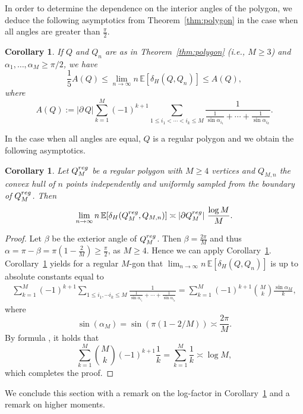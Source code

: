 \documentclass[a4paper,12pt]{article}
\newtheorem{corollary}[proposition]{Corollary}
\theoremstyle{definition}
\newcommand{\IE}{\mathbb{E}}
\begin{document}
In order to determine the dependence on the interior angles of the polygon, we deduce the following asymptotics from Theorem~\ref{thm:polygon} in the case when all angles are greater than $\frac{\pi}{2}$.

\begin{corollary}\label{cor:asymptotics}
If $Q$ and $Q_n$ are as in Theorem~\ref{thm:polygon} (i.e., $M\geq 3$) and $\alpha_1,\dots,\alpha_M\ge \pi/2$, we have
\begin{equation*}\label{polygon-5}
\frac{1}{5} A(Q) 
\le \lim_{n\to\infty}n \, \IE[\delta_H(Q,Q_n)]
\le A(Q),
\end{equation*}
where 
\[
A(Q)
:= \left| \partial \, Q \right|\sum_{k=1}^{M}(-1)^{k+1}\sum_{1\leq i_{1}<\cdots< i_{k}\leq M} \frac{1}{\frac{1}{\sin\alpha_{i_{1}}}+\cdots+\frac{1}{\sin\alpha_{i_{k}}}}.
\]
\end{corollary}

In the case when all angles are equal, $Q$ is a regular polygon and we obtain the following asymptotics.

\begin{corollary}\label{cor:mgon}
Let $Q_M^{\rm reg}$ be a regular polygon with $M\ge 4$ vertices and $Q_{M,n}$ the convex hull of $n$ points independently and uniformly sampled from the boundary of $Q_M^{\rm reg}$. Then
\[
\lim_{n\to\infty}n \, \IE[\delta_H(Q_M^{\rm reg},Q_{M,n})]\asymp \left |\partial Q_M^{\rm reg}\right| \, \frac{\log M}{M}. 
\]
\end{corollary}
\begin{proof}
Let $\beta$ be the exterior angle of $Q_M^{\rm reg}$. Then $\beta=\frac{2 \pi}{M}$ and thus $\alpha= \pi-\beta = \pi(1-\frac{2}{M}) \geq \frac{\pi}{2}$, as $M\geq 4$.  Hence  we 
can apply Corollary~\ref{cor:asymptotics}.
 Corollary~\ref{cor:asymptotics} yields for a regular $M$-gon that $\lim_{n\to\infty}n \, \IE[\delta_H(Q,Q_n)]$ is up to absolute constants equal to
\begin{eqnarray*}
\sum_{k=1}^{M}(-1)^{k+1}\sum_{1\leq i_{1},\cdots i_{k}\leq M}
\frac{1}{\frac{1}{\sin\alpha_{i_{1}}}+\cdots+\frac{1}{\sin\alpha_{i_{k}}}}
=\sum_{k=1}^{M}(-1)^{k+1}{M\choose k}\frac{\sin\alpha_{M}}{k},
\end{eqnarray*}
where
\[
\sin(\alpha_M)=\sin(\pi(1-2/M))\asymp \frac{2\pi}{M}.
\]
By formula \cite[0.155/4]{GR07}, it holds that
\[
\sum_{k=1}^{M}\binom{M}{k}(-1)^{k+1}\frac{1}{k}
= \sum_{k=1}^{M}\frac{1}{k}
\asymp \log M,
\]
which completes the proof.
\end{proof}

We conclude this section with  a remark on the log-factor in Corollary~\ref{cor:mgon} and a remark on higher moments.
\end{document}
